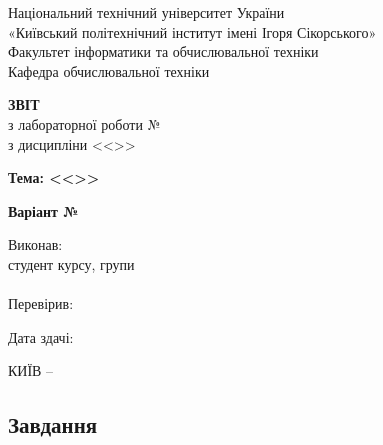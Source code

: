 \documentclass[14pt, a4paper]{extreport}
\begin{document}
	
	\begin{titlepage}
		\begin{center}
			\normalsize
			Національний технічний університет України\\
			«Київський політехнічний інститут імені Ігоря Сікорського» \\[0.5em]
			Факультет інформатики та обчислювальної техніки\\
			Кафедра обчислювальної техніки
			
			\vfill
			
			{\large \textbf{ЗВІТ}\\[0.5em]}
			{з лабораторної роботи №\LabNumber \\}
			{з дисципліни <<\CourseTitle>>}
			
			\vspace{2em}
			
			{\textbf{Тема: <<\Topic>>}}
			
			\vspace{1em}
			
			{\textbf{Варіант №\Variant}}
			
			\vfill
			
			\begin{flushright}
				Виконав: \\ студент \CourseNumber{} курсу, групи \StudentGroup \\
				\StudentName \\[1em]
				Перевірив: \\ \Teacher
			\end{flushright}
			
			\vfill
			
			\begin{flushright}
				Дата здачі: \DTMtoday
			\end{flushright}
			
			\vspace{5em}
			КИЇВ -- \ReportYear
		\end{center}
	\end{titlepage}
	
	\clearpage
	\setcounter{page}{2}
	
	\subsection*{Завдання}
	
\end{document}

